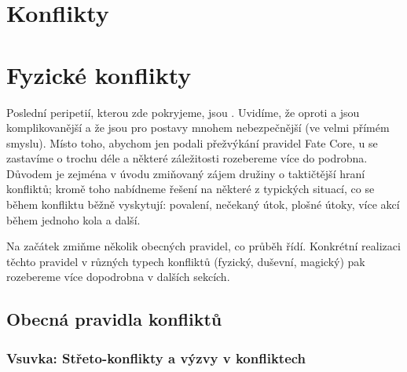 \documentclass[../main.tex]{subfiles}
\begin{document}
\section{Konflikty}

\section{Fyzické konflikty}
\label{sec:boj}


Poslední peripetií, kterou zde pokryjeme, jsou . Uvidíme, že oproti  a  jsou komplikovanější a že jsou pro postavy mnohem nebezpečnější (ve velmi přímém smyslu). Místo toho, abychom jen podali přežvýkání pravidel Fate Core, u  se zastavíme o trochu déle a některé záležitosti rozebereme více do podrobna. Důvodem je zejména v úvodu  zmiňovaný zájem družiny o taktičtější hraní konfliktů; kromě toho nabídneme řešení na některé z typických situací, co se během konfliktu běžně vyskytují: povalení, nečekaný útok, plošné útoky, více akcí během jednoho kola a další.

Na začátek zmiňme několik obecných pravidel, co průběh  řídí. Konkrétní realizaci těchto pravidel v různých typech konfliktů (fyzický, duševní, magický) pak rozebereme více dopodrobna v dalších sekcích.

\subsection{Obecná pravidla konfliktů}
\label{sec:obecna-pravidla}

\subsubsection{Vsuvka: Střeto-konflikty a výzvy v konfliktech}
\label{sec:hybrid}
\end{document}

